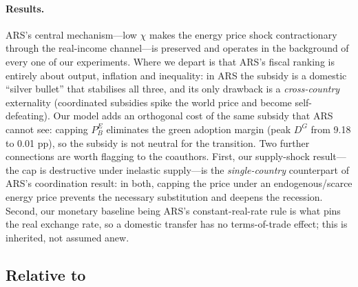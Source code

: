 \documentclass[11pt,a4paper]{article}
\begin{document}
\paragraph{Results.} ARS's central mechanism---low $\chi$ makes the energy
price shock contractionary through the real-income channel---is preserved and
operates in the background of every one of our experiments. Where we depart is
that ARS's fiscal ranking is entirely about output, inflation and inequality:
in ARS the subsidy is a domestic ``silver bullet'' that stabilises all three,
and its only drawback is a \emph{cross-country} externality (coordinated
subsidies spike the world price and become self-defeating). Our model adds an
orthogonal cost of the same subsidy that ARS cannot see: capping $P^E_B$
eliminates the green adoption margin (peak $D^G$ from 9.18 to 0.01 pp), so the
subsidy is not neutral for the transition. Two further connections are worth
flagging to the coauthors. First, our supply-shock result---the cap is
destructive under inelastic supply---is the \emph{single-country} counterpart
of ARS's coordination result: in both, capping the price under an
endogenous/scarce energy price prevents the necessary substitution and deepens
the recession. Second, our monetary baseline being ARS's constant-real-rate
rule is what pins the real exchange rate, so a domestic transfer has no
terms-of-trade effect; this is inherited, not assumed anew.

\subsection{Relative to \citet{Bayer2026}}
\end{document}
